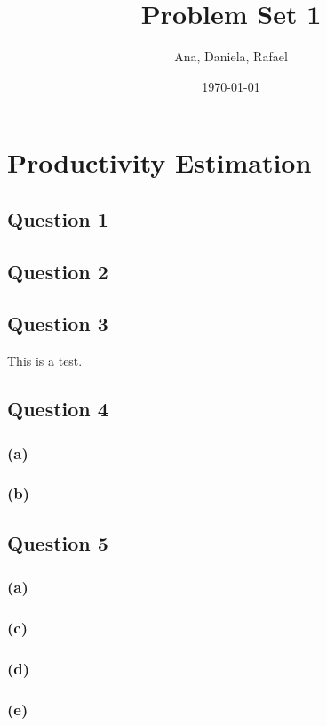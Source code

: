 \documentclass[11pt]{article}
\title{Problem Set 1}
\author{Ana, Daniela, Rafael}
\date{\today}
\begin{document}
\maketitle

\section*{Productivity Estimation}

\subsection*{Question 1}




\FloatBarrier

\newpage
\subsection*{Question 2}

\FloatBarrier

\subsection*{Question 3}

\FloatBarrier
This is a test. 

\newpage
\subsection*{Question 4}
\subsubsection*{(a)}

\FloatBarrier

\subsubsection*{(b)}


\FloatBarrier

\subsection*{Question 5}
\subsubsection*{(a)}

\FloatBarrier

\subsubsection*{(c)}

\FloatBarrier

\newpage
\subsubsection*{(d)}

\FloatBarrier

\subsubsection*{(e)}

\FloatBarrier
\end{document}
